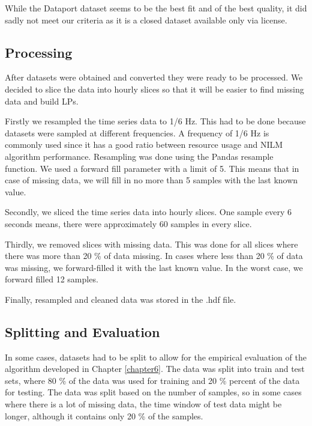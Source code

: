 While the Dataport dataset seems to be the best fit and of the best quality, it did sadly not meet our criteria as it is a closed dataset available only via license.

\subsection{Processing}

After datasets were obtained and converted they were ready to be processed.
We decided to slice the data into hourly slices so that it will be easier to find missing data and build LPs.

Firstly we resampled the time series data to 1/6 Hz. 
This had to be done because datasets were sampled at different frequencies.
A frequency of 1/6 Hz is commonly used since it has a good ratio between resource usage and NILM algorithm performance.
Resampling was done using the Pandas resample function. 
We used a forward fill parameter with a limit of 5.
This means that in case of missing data, we will fill in no more than 5 samples with the last known value.

Secondly, we sliced the time series data into hourly slices. 
One sample every 6 seconds means, there were approximately 60 samples in every slice.

Thirdly, we removed slices with missing data.
This was done for all slices where there was more than 20 \% of data missing.
In cases where less than 20 \% of data was missing, we forward-filled it with the last known value.
In the worst case, we forward filled 12 samples. 

Finally, resampled and cleaned data was stored in the .hdf file.


\subsection{Splitting and Evaluation} \label{ssec:ds_eval}

In some cases, datasets had to be split to allow for the empirical evaluation of the algorithm developed in Chapter \ref{chapter6}.
The data was split into train and test sets, where 80 \% of the data was used for training and 20 \% percent of the data for testing.
The data was split based on the number of samples, so in some cases where there is a lot of missing data, the time window of test data might be longer, although it contains only 20 \% of the samples.

